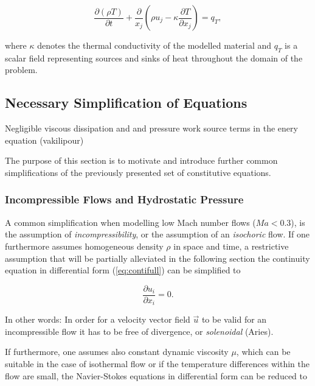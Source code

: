     \begin{equation}
      \frac{\partial \left(\rho T \right)}{\partial t} + \frac{\partial}{x_j} \left( \rho u_j - \kappa \frac{\partial T}{\partial x_j} \right) = q_T,
    \end{equation}

    where \(\kappa\) denotes the thermal conductivity of the modelled material and \(q_T\) is a scalar field representing sources and sinks of heat throughout the domain of the problem. 


    \subsection{Necessary Simplification of Equations}
        Negligible viscous dissipation and and pressure work source terms in the enery equation (vakilipour)

        The purpose of this section is to motivate and introduce further common simplifications of the previously presented set of constitutive equations. 

      \subsubsection{Incompressible Flows and Hydrostatic Pressure}

      A common simplification when modelling low Mach number flows (\(Ma < 0.3\)), is the assumption of \textit{incompressibility}, or the assumption of an \textit{isochoric} flow. If one furthermore assumes homogeneous density \(\rho\) in space and time, a restrictive assumption that will be partially alleviated in the following section the continuity equation in differential form (\ref{eq:contifull}) can be simplified to

      \begin{equation}
        \label{eq:contiinc}
        \frac{\partial u_i}{\partial x_i} = 0.
      \end{equation}

      In other words: In order for a velocity vector field \(\vec{u}\) to be valid for an incompressible flow it has to be free of divergence, or \textit{solenoidal} (Aries).

      If furthermore, one assumes also constant dynamic viscosity \(\mu\), which can be suitable in the case of isothermal flow or if the temperature differences within the flow are small, the Navier-Stokes equations in differential form can be reduced to 

